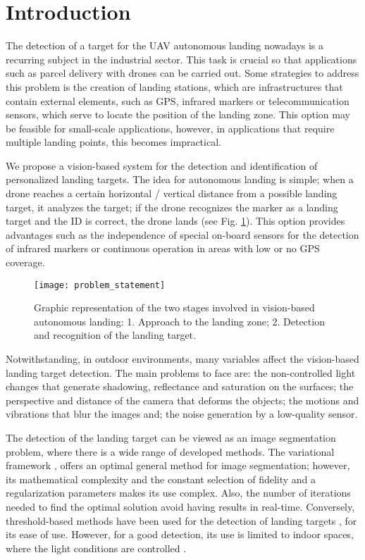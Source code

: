 \section{Introduction}\label{sec:introduction_ch1}

The detection of a target for the UAV autonomous landing nowadays is a recurring subject in the industrial sector. This task is crucial so that applications such as parcel delivery with drones can be carried out. Some strategies to address this problem is the creation of landing stations, which are infrastructures that contain external elements, such as GPS, infrared markers or telecommunication sensors, which serve to locate the position of the landing zone. This option may be feasible for small-scale applications, however, in applications that require multiple landing points, this becomes impractical.

We propose a vision-based system for the detection and identification of personalized landing targets. The idea for autonomous landing is simple; when a drone reaches a certain horizontal / vertical distance from a possible landing target, it analyzes the target; if the drone recognizes the marker as a landing target and the ID is correct, the drone lands (see Fig. \ref{fig:visionbased_landing_problem_sketch}). This option provides advantages such as the independence of special on-board sensors for the detection of infrared markers or continuous operation in areas with low or no GPS coverage. 

\begin{figure}[!ht]
    \centering
    \texttt{[image: problem\_statement]}        
    \caption{Graphic representation of the two stages involved in vision-based autonomous landing: 1. Approach to the landing zone; 2. Detection and recognition of the landing target.}\label{fig:visionbased_landing_problem_sketch}
\end{figure}

Notwithstanding, in outdoor environments, many variables affect the vision-based landing target detection. 
The main problems to face are: the non-controlled light changes that generate shadowing, reflectance and saturation on the surfaces; the perspective and distance of the camera that deforms the objects; the motions and vibrations that blur the images and; the noise generation by a low-quality sensor.


The detection of the landing target can be viewed as an image segmentation problem, where there is a wide range of developed methods. The variational framework \citep{Mumford.Shah:CPAM:1989}, offers an optimal general method for image segmentation; however, its mathematical complexity and the constant selection of fidelity and a regularization parameters makes its use complex. Also, the number of iterations needed to find the optimal solution avoid having results in real-time. Conversely, threshold-based methods have been used for the detection of landing targets \citep{Lacroix.Caballero:IROS:2006}, \citep{Lange.Sunderhauf.ea:SIMPAR:2008} for its ease of use. However, for a good detection, its use is limited to indoor spaces, where the light conditions are controlled \citep{Araar.Aouf.ea:IROS:2017}. 

